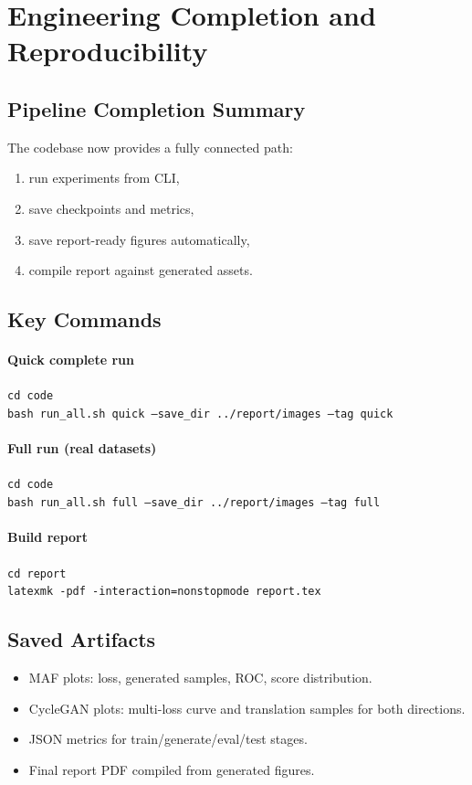 \documentclass[conference]{IEEEtran}
\begin{document}
\section{Engineering Completion and Reproducibility}

\subsection{Pipeline Completion Summary}
The codebase now provides a fully connected path:
\begin{enumerate}
\item run experiments from CLI,
\item save checkpoints and metrics,
\item save report-ready figures automatically,
\item compile report against generated assets.
\end{enumerate}

\subsection{Key Commands}
\paragraph{Quick complete run}
\texttt{cd code}\\
\texttt{bash run\_all.sh quick --save\_dir ../report/images --tag quick}

\paragraph{Full run (real datasets)}
\texttt{cd code}\\
\texttt{bash run\_all.sh full --save\_dir ../report/images --tag full}

\paragraph{Build report}
\texttt{cd report}\\
\texttt{latexmk -pdf -interaction=nonstopmode report.tex}

\subsection{Saved Artifacts}
\begin{itemize}
\item MAF plots: loss, generated samples, ROC, score distribution.
\item CycleGAN plots: multi-loss curve and translation samples for both directions.
\item JSON metrics for train/generate/eval/test stages.
\item Final report PDF compiled from generated figures.
\end{itemize}
\end{document}
